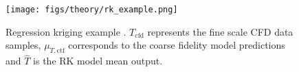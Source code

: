 %
%


\begin{figure}[hbtp]
	\centering
	\texttt{[image: figs/theory/rk\_example.png]}
	\caption[Regression kriging example.]{Regression kriging example \cite{Hengl07}.  $T_{\mathrm{cfd}}$ represents the fine scale CFD data samples, $\mu_{T,\mathrm{ctf}}$ corresponds to the coarse fidelity model predictions and $\hat T$ is the RK model mean output.}
	\label{fig:fit_rk}
\end{figure}

